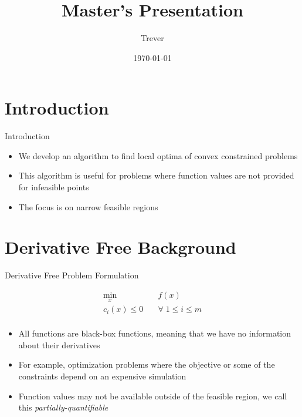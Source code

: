 \documentclass{beamer}
\begin{document}
\title{Master's Presentation}   
\author{Trever} 
\date{\today} 

\frame{\titlepage} 

\section{Introduction}

\begin{frame}{Introduction}
    \begin{itemize}
        \item We develop an algorithm to find local optima of convex constrained problems
        \item This algorithm is useful for problems where function values are not provided for infeasible points
        \item The focus is on narrow feasible regions
    \end{itemize}
\end{frame}

\section{Derivative Free Background}

\begin{frame}{Derivative Free Problem Formulation}
\begin{center}
\label{Problem}
\begin{align*}
\min_x & \quad f(x) \\
  c_i(x) \le 0   & \quad \forall \; 1 \le i \le m \\
\end{align*}
\end{center}
    \begin{itemize}
        \item All functions are black-box functions, meaning that we have no information about their derivatives
        \item For example, optimization problems where the objective or some of the constraints depend on an expensive simulation
        \item Function values may not be available outside of the feasible region, we call this \emph{partially-quantifiable}
    \end{itemize}
\end{frame}
\end{document}
